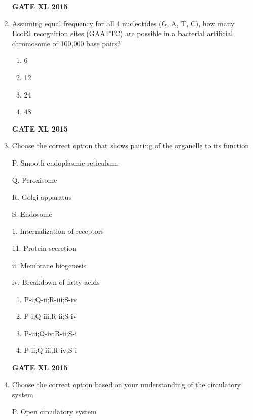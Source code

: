 \documentclass[journal,12pt,onecolumn]{IEEEtran}
\begin{document}
\begin{enumerate}
\hfill{\textbf{GATE XL 2015}}
\item Assuming equal frequency for all 4 nucleotides (G, A, T, C), how many EcoRI recognition sites (GAATTC) are possible in a bacterial artificial chromosome of 100,000 base pairs?
    \begin{enumerate}
            \item 6
	    \item 12
	    \item 24
            \item 48
    \end{enumerate}
\hfill{\textbf{GATE XL 2015}}
\item  Choose the correct option that shows pairing of the organelle to its function



	\begin{minipage}{0.5\textwidth}\begin{flushleft}
P. Smooth endoplasmic reticulum.

Q. Peroxisome

R. Golgi apparatus

S. Endosome
	\end{flushleft}
	\end{minipage}
	\begin{minipage}{0.5\textwidth}\begin{flushleft}
1. Internalization of receptors

11. Protein secretion

ii. Membrane biogenesis 

iv. Breakdown of fatty acids
	\end{flushleft}
	\end{minipage}
    \begin{enumerate}
            \item P-i;Q-ii;R-iii;S-iv
            \item P-i;Q-iii;R-ii;S-iv
            \item P-iii;Q-iv;R-ii;S-i
            \item P-ii;Q-iii;R-iv;S-i
    \end{enumerate}
\hfill{\textbf{GATE XL 2015}}

\item Choose the correct option based on your understanding of the circulatory system

	\begin{minipage}{0.5\textwidth}\begin{flushleft}
P. Open circulatory system


\end{flushleft}
\end{minipage}
\end{enumerate}
\end{document}
